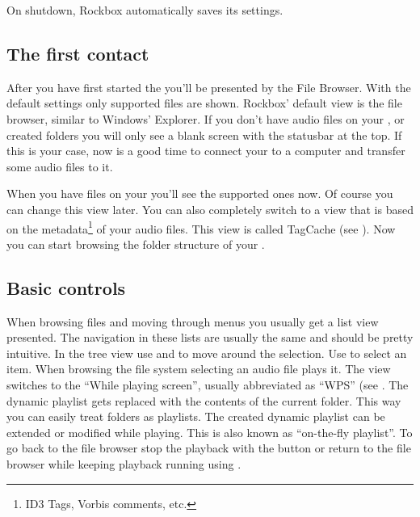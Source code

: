 \label{ref:Safeshutdown}On shutdown, Rockbox automatically saves its settings.
\subsection{The first contact}

After you have  first started the \dap{} you'll be presented by the File
Browser. With the default settings only supported files are shown. Rockbox'
default view is the file browser, similar to Windows' Explorer. If you don't
have audio files on your \dap{}, or created folders you will only see a blank
screen with the statusbar at the top. If this is your case, now is a good time
to connect your \dap{} to a computer and transfer some audio files to it.

When you have files on your \dap{} you'll see the supported ones now. Of
course you can change this view later. You can also completely switch to
a view that is based on the metadata\footnote{ID3 Tags, Vorbis comments, etc.}
of your audio files. This view is called TagCache (see
). Now you can start browsing the folder structure of
your \dap{}.

\subsection{Basic controls}
When browsing files and moving through menus you usually get a list view
presented. The navigation in these lists are usually the same and should be
pretty intuitive.
In the tree view use \ActionStdNext{} and \ActionStdPrev{} to move around
the selection. Use \ActionStdOk{} to select an item. When browsing the file
system selecting an audio file plays it. The view switches to the ``While
playing screen'', usually abbreviated as ``WPS'' (see . The
dynamic playlist gets replaced with the contents of the current folder. This
way you can easily treat folders as playlists. The created dynamic playlist can
be extended or modified while playing. This is also known as
``on-the-fly playlist''.
To go back to the file browser stop the playback with the \ActionWpsStop{}
button or return to the file browser while keeping playback running using
\ActionWpsBrowse{}. 

